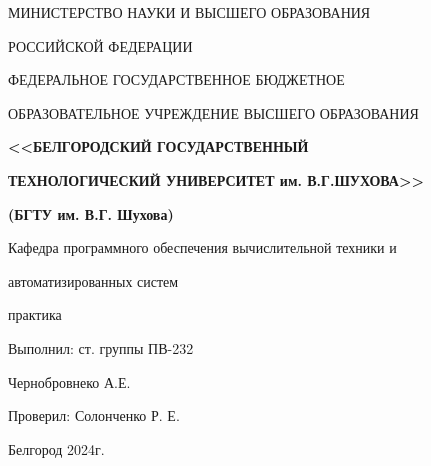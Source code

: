 \begin{center}
	МИНИСТЕРСТВО НАУКИ И ВЫСШЕГО ОБРАЗОВАНИЯ

	РОССИЙСКОЙ ФЕДЕРАЦИИ

	\vskip 0.5cm

	ФЕДЕРАЛЬНОЕ ГОСУДАРСТВЕННОЕ БЮДЖЕТНОЕ

	ОБРАЗОВАТЕЛЬНОЕ УЧРЕЖДЕНИЕ ВЫСШЕГО ОБРАЗОВАНИЯ

	\vskip 0.5cm

	\textbf{<<БЕЛГОРОДСКИЙ ГОСУДАРСТВЕННЫЙ}

	\textbf{ТЕХНОЛОГИЧЕСКИЙ УНИВЕРСИТЕТ им. В.Г.ШУХОВА>>}

	\textbf{(БГТУ им. В.Г. Шухова)}

	\vskip 0.5cm

	Кафедра программного обеспечения вычислительной техники и

	автоматизированных систем

	\vskip 3cm

	\large{ практика}

	\vskip 7cm

	\begin{flushright}
		Выполнил: ст. группы ПВ-232

		Чернобровнеко А.Е.

		Проверил: Солонченко Р. Е.
	\end{flushright}

	\vskip 6cm

	Белгород 2024г.
\end{center}

\newpage

\onehalfspacing\tableofcontents

\newpage
